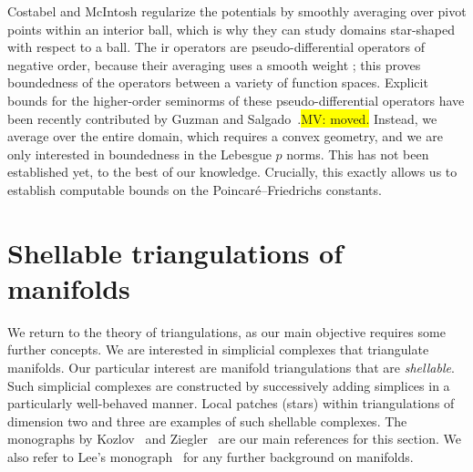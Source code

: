 \documentclass[10pt,a4paper]{article}
\newcommand{\todo}[1]{{\colorbox{yellow}{#1}}}
\newcommand\cye[1]{%
\protect\leavevmode
\begingroup
    \color{blue}%
    #1%
\endgroup
}
\begin{document}
\begin{remark}
    {\color{blue}
    Costabel and McIntosh regularize the potentials by smoothly averaging over pivot points within an interior ball, 
    which is why they \cye{can} study domains star-shaped with respect to a ball. 
    The\cye{ir} operators are pseudo-differential operators of negative order, 
    because their averaging uses a smooth weight\cye{; this} proves boundedness of the operators between a variety of function spaces. 
    Explicit bounds for the higher-order seminorms of these pseudo-differential operators 
    have been \cye{recently} contributed by Guzman and Salgado~\cite{guzman2021estimation}.\todo{MV: moved.}
    Instead, we average over the entire domain, which requires a convex geometry, \cye{and we are only interested in boundedness in the Lebesgue $p$ norms.} This has not been established yet, to the best of our knowledge. \cye{Crucially, this exactly allows us to} establish \cye{computable bounds on the} Poincar\'e--Friedrichs constants.   
    }
\end{remark}














































\section{Shellable triangulations of manifolds}\label{section:advancedtriangulations}

We return to the theory of triangulations,
as our main objective requires some further concepts.
We are interested in simplicial complexes that triangulate manifolds. 
Our particular interest are manifold triangulations that are \emph{shellable}.
Such simplicial complexes are constructed by successively adding simplices in a particularly well-behaved manner. 
Local patches (stars) within triangulations of dimension two and three are examples of such shellable complexes. 
The monographs by Kozlov~\cite{kozlov2008combinatorial} and Ziegler~\cite{ziegler1995lectures} are our main references for this section. 
We also refer to Lee's monograph~\cite{lee2011topological} for any further background on manifolds. 
\end{document}

